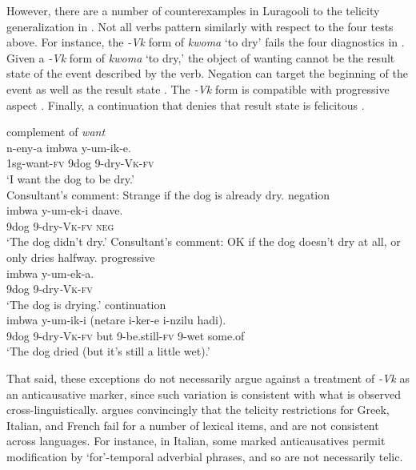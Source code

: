 \documentclass[output=paper]{langsci/lanmgscibook}
\begin{document}
However, there are a number of counterexamples in Luragooli to the telicity generalization in . Not all verbs pattern similarly with respect to the four tests above. For instance, the \textit{-Vk} form of \textit{kwoma} ‘to dry’ fails the four diagnostics in . Given a \textit{-Vk} form of \textit{kwoma} ‘to dry,’ the object of wanting cannot be the result state  of the event described by the verb. Negation can target the beginning of the event as well as the result state . The \textit{-Vk} form is compatible with progressive aspect . Finally, a continuation that denies that result state is felicitous .

\ea\label{ex:gluckman:16} 
  \ea\label{ex:gluckman:16a}
  {{complement of} {\textit{want}}}\\
  \gll n-eny-a          imbwa y-um-ik-e.\\
      1sg-want-\textsc{fv} 9dog    9-dry-\textsc{Vk}-\textsc{fv}\\
  \glt ‘I want the dog to be dry.’\\
  \glt Consultant’s comment: Strange if the dog is already dry.
  \ex\label{ex:gluckman:16b}
  {{negation}}\\
  \gll imbwa y-um-ek-i     daave.\\
      9dog    9-dry-\textsc{Vk}-\textsc{fv} \textsc{neg}\\
  \glt ‘The dog didn’t dry.’
  \glt Consultant’s comment: OK if the dog doesn’t dry at all, or only dries halfway.
  \ex\label{ex:gluckman:16c}
  {{progressive}}\\
  \gll imbwa y-um-ek-a.\\
      9dog   9-dry\textit{-}\textsc{Vk}-\textsc{fv}\\
  \glt ‘The dog is drying.’
  \ex\label{ex:gluckman:16d}
  {{continuation}}\\
  \gll imbwa y-um-ik-i      (netare i-ker-e         i-nzilu hadi).\\
      9dog   9-dry\textit{-}\textsc{Vk}-\textsc{fv} but       9-be.still-\textsc{fv} 9-wet some.of\\
  \glt ‘The dog dried (but it’s still a little wet).’
  \z
\z

That said, these exceptions do not necessarily argue against a treatment of \textit{-Vk} as an anticausative marker, since such variation is consistent with what is observed cross-linguistically. \citet{Schäfer2008} argues convincingly that the telicity restrictions for Greek, Italian, and French fail for a number of lexical items, and are not consistent across languages. For instance, in Italian, some marked anticausatives permit modification by ‘for’-temporal adverbial phrases, and so are not necessarily telic.
\end{document}
